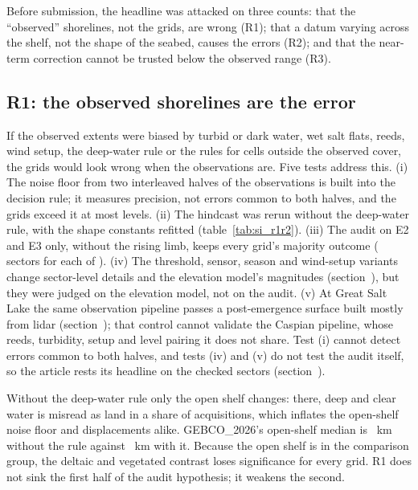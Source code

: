 
Before submission, the headline was attacked on three counts: that the ``observed'' shorelines, not the grids, are wrong (R1); that a datum varying across the shelf, not the shape of the seabed, causes the errors (R2); and that the near-term correction cannot be trusted below the observed range (R3).

\subsection*{R1: the observed shorelines are the error}
If the observed extents were biased by turbid or dark water, wet salt flats, reeds, wind setup, the deep-water rule or the rules for cells outside the observed cover, the grids would look wrong when the observations are. Five tests address this. (i) The noise floor from two interleaved halves of the observations is built into the decision rule; it measures precision, not errors common to both halves, and the grids exceed it at most levels. (ii) The hindcast was rerun without the deep-water rule, with the shape constants refitted (table~\ref{tab:si_r1r2}). (iii) The audit on E2 and E3 only, without the rising limb, keeps every grid's majority outcome ( sectors for each of ). (iv) The threshold, sensor, season and wind-setup variants change sector-level details and the elevation model's magnitudes (section~\SIrobust), but they were judged on the elevation model, not on the audit. (v) At Great Salt Lake the same observation pipeline passes a post-emergence surface built mostly from lidar (section~\SIgsl); that control cannot validate the Caspian pipeline, whose reeds, turbidity, setup and level pairing it does not share. Test (i) cannot detect errors common to both halves, and tests (iv) and (v) do not test the audit itself, so the article rests its headline on the checked sectors (section~\SIrevision).

Without the deep-water rule only the open shelf changes: there, deep and clear water is misread as land in a share of acquisitions, which inflates the open-shelf noise floor and displacements alike. GEBCO\_2026's open-shelf median is ~km without the rule against ~km with it. Because the open shelf is in the comparison group, the deltaic and vegetated contrast loses significance for every grid. R1 does not sink the first half of the audit hypothesis; it weakens the second.

